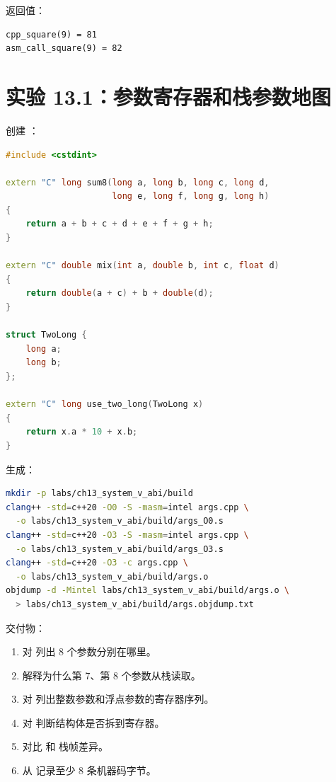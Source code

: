 返回值：

\begin{lstlisting}
cpp_square(9) = 81
asm_call_square(9) = 82
\end{lstlisting}

\section{实验 13.1：参数寄存器和栈参数地图}

\begin{labbox}
创建 ：

\begin{lstlisting}[language=C++]
#include <cstdint>

extern "C" long sum8(long a, long b, long c, long d,
                     long e, long f, long g, long h)
{
    return a + b + c + d + e + f + g + h;
}

extern "C" double mix(int a, double b, int c, float d)
{
    return double(a + c) + b + double(d);
}

struct TwoLong {
    long a;
    long b;
};

extern "C" long use_two_long(TwoLong x)
{
    return x.a * 10 + x.b;
}
\end{lstlisting}

生成：

\begin{lstlisting}[language=bash]
mkdir -p labs/ch13_system_v_abi/build
clang++ -std=c++20 -O0 -S -masm=intel args.cpp \
  -o labs/ch13_system_v_abi/build/args_O0.s
clang++ -std=c++20 -O3 -S -masm=intel args.cpp \
  -o labs/ch13_system_v_abi/build/args_O3.s
clang++ -std=c++20 -O3 -c args.cpp \
  -o labs/ch13_system_v_abi/build/args.o
objdump -d -Mintel labs/ch13_system_v_abi/build/args.o \
  > labs/ch13_system_v_abi/build/args.objdump.txt
\end{lstlisting}

交付物：

\begin{enumerate}
  \item 对  列出 8 个参数分别在哪里。
  \item 解释为什么第 7、第 8 个参数从栈读取。
  \item 对  列出整数参数和浮点参数的寄存器序列。
  \item 对  判断结构体是否拆到寄存器。
  \item 对比 \code{-O0} 和 \code{-O3} 栈帧差异。
  \item 从 \code{objdump} 记录至少 8 条机器码字节。
\end{enumerate}
\end{labbox}


